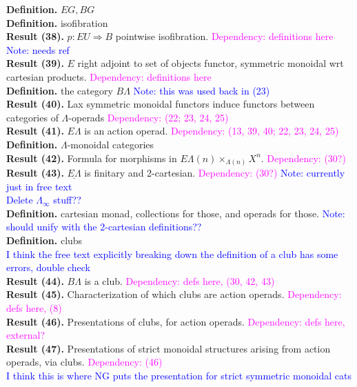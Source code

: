 \documentclass{amsart}
\newcommand{\ul}{\underline}
\begin{document}
\textbf{Definition.} $EG, BG$
\\ \textbf{Definition.} isofibration
\\ \textbf{Result (38).} $p:EU \Rightarrow B$ pointwise isofibration. \textcolor{magenta}{Dependency: definitions here} \textcolor{blue}{Note: needs ref}
\\ \textbf{Result (39).} $E$ right adjoint to set of objects functor, symmetric monoidal wrt cartesian products. \textcolor{magenta}{Dependency: definitions here}
\\ \textbf{Definition.} the category $B\Lambda$ \textcolor{blue}{Note: this was used back in (23)}
\\ \textbf{Result (40).} Lax symmetric monoidal functors induce functors between categories of $\Lambda$-operads \textcolor{magenta}{Dependency: (22; 23, 24, 25)}
\\ \textbf{Result (41).} $E\Lambda$ is an action operad. \textcolor{magenta}{Dependency: (13, 39, 40; 22, 23, 24, 25)}
\\ \textbf{Definition.} $\Lambda$-monoidal categories
\\ \textbf{Result (42).} Formula for morphisms in $E\Lambda(n) \times_{\Lambda(n)} X^n$. \textcolor{magenta}{Dependency: (30?)}
\\ \textbf{Result (43).} $\ul{E\Lambda}$ is finitary and 2-cartesian. \textcolor{magenta}{Dependency: (30?)} \textcolor{blue}{Note: currently just in free text}
\\ \textcolor{blue}{Delete $\Lambda_{\infty}$ stuff??}
\\ \textbf{Definition.} cartesian monad, collections for those, and operads for those. \textcolor{blue}{Note: should unify with the 2-cartesian definitions??}
\\ \textbf{Definition.} clubs
\\ \textcolor{blue}{I think the free text explicitly breaking down the definition of a club has some errors, double check}
\\ \textbf{Result (44).} $B\Lambda$ is a club. \textcolor{magenta}{Dependency: defs here, (30, 42, 43)}
\\ \textbf{Result (45).} Characterization of which clubs are action operads. \textcolor{magenta}{Dependency: defs here, (8)}
\\ \textbf{Result (46).} Presentations of clubs, for action operads. \textcolor{magenta}{Dependency: defs here, external?}
\\ \textbf{Result (47).} Presentations of strict monoidal structures arising from action operads, via clubs. \textcolor{magenta}{Dependency: (46)}
\\ \textcolor{blue}{I think this is where NG puts the presentation for strict symmetric monoidal cats}
\end{document}
